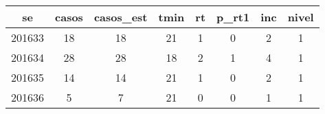 \begin{tabular}{c|ccccccc}
  \hline
se & casos & casos\_est & tmin & rt & p\_rt1 & inc & nivel \\ 
  \hline
201633 & 18 & 18 & 21 & 1 & 0 & 2 & 1 \\ 
  201634 & 28 & 28 & 18 & 2 & 1 & 4 & 1 \\ 
  201635 & 14 & 14 & 21 & 1 & 0 & 2 & 1 \\ 
  201636 & 5 & 7 & 21 & 0 & 0 & 1 & 1 \\ 
   \hline
\end{tabular}
